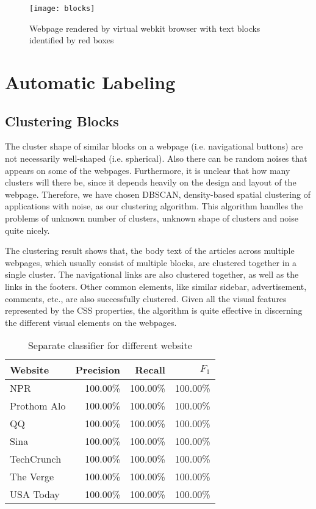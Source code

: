 \documentclass{acm_proc_article-sp}
\begin{document}
\begin{figure}[htp]
\texttt{[image: blocks]}
\caption{\label{figure:blocks}Webpage rendered by virtual webkit browser with text blocks identified by red boxes}
\end{figure}

\section{Automatic Labeling}


\subsection{Clustering Blocks}

The cluster shape of similar blocks on a webpage (i.e. navigational buttons) are not necessarily well-shaped (i.e. spherical). Also there can be random noises that appears on some of the webpages. Furthermore, it is  unclear that how many clusters will there be, since it depends heavily on the design and layout of the webpage. Therefore, we have chosen DBSCAN\cite{ester:dbscan}, density-based spatial clustering of applications with noise, as our clustering algorithm. This algorithm handles the problems of unknown number of clusters, unknown shape of clusters and noise quite nicely.

The clustering result shows that, the body text of the articles across multiple webpages, which usually consist of multiple blocks, are clustered together in a single cluster. The navigational links are also clustered together, as well as the links in the footers. Other common elements, like similar sidebar, advertisement, comments, etc., are also successfully clustered. Given all the visual features represented by the CSS properties, the algorithm is quite effective in discerning the different visual elements on the webpages.

\newpage
\begin{table}
\centering
\caption{\label{table:approach1}Separate classifier for different website}
\begin{tabular}{|l|r|r|r|} \hline
Website&Precision&Recall&$F_1$\\ \hline\hline
NPR&100.00\%&100.00\%&100.00\%\\ \hline
Prothom Alo&100.00\%&100.00\%&100.00\%\\ \hline
QQ&100.00\%&100.00\%&100.00\%\\ \hline
Sina&100.00\%&100.00\%&100.00\%\\ \hline
TechCrunch&100.00\%&100.00\%&100.00\%\\ \hline
The Verge&100.00\%&100.00\%&100.00\%\\ \hline
USA Today&100.00\%&100.00\%&100.00\%\\ \hline
\end{tabular}
\end{table}
\end{document}
